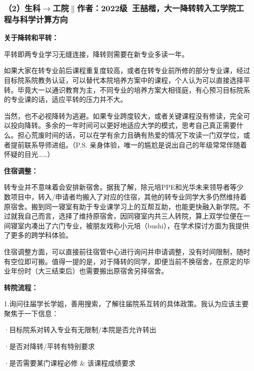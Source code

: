 \documentclass[11pt,oneside]{book}
\begin{document}
\subsubsection{（2）生科$\to$工院$\parallel$作者：2022级\ 王喆楷，大一降转转入工学院工程与科学计算方向}
\textbf{\textbf{关于降转和平转}}\textbf{\textbf{：}}

平转即两专业学习无缝连接，降转则需要在新专业多读一年。

\vspace{10pt}

如果大家在转专业前后课程重复度较高，或者在转专业前所修的部分专业课，经过目标院系院教务认证，可以替代本院培养方案中的课程，个人认为可以直接选择平转。毕竟大一以通识教育为主，不同专业的培养方案大相径庭，有心预习目标院系的专业课的话，适应平转的压力并不大。

\vspace{10pt}

当然，也不必视降转为逃避。如果专业跨度较大，或者关键课程没有修读，完全可以投向降转。多余的一年时间可以更好地适应大学的模式，思考自己真正需要什么。担心荒废时间的话，可以在学有余力且确有热爱的情况下攻读一门双学位，或者提前联系导师进组。（P.S. 亲身体验，唯一的尴尬是说出自己的年级常常伴随着怀疑的目光……）

\textbf{住宿调整：}

转专业并不意味着会安排新宿舍。据我了解，除元培PPE和光华未来领导者等少数项目中，转入/申请者均搬入了对应的住宿，其他的转专业同学大多仍然维持着原宿舍。搬到同一寝室有助于专业课学习上的互帮互助，也能更快融入新学院。不过就我自己而言，选择了维持原宿舍，因同寝室内共三人转院，算上双学位便在一间寝室内凑出了六门专业，被朋友戏称小元培（bushi），在学术探讨方面为我提供了更多的跨学科体验。

\vspace{10pt}

住宿调整方面，可以直接前往宿管中心进行询问并申请调整，没有时间限制，随时有空位即可搬。值得一提的是，对于降转的同学，即便当前不换宿舍，在原定的毕业年份时（大三结束后）也需要搬出原宿舍另择宿舍。

\vspace{10pt}

\textbf{转院流程：}

1.询问往届学长学姐，善用搜索，了解往届院系互转的具体政策。我认为应该主要聚焦于一下信息：

·目标院系对转入专业有无限制/本院是否允许转出

·是否对降转/平转有特别要求

·是否需要某门课程必修 \& 该课程成绩要求
\end{document}
